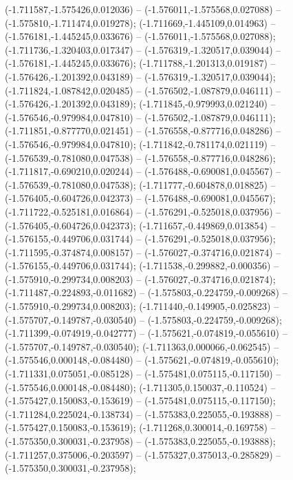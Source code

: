  (-1.711587,-1.575426,0.012036) -- (-1.576011,-1.575568,0.027088) -- (-1.575810,-1.711474,0.019278);
 (-1.711669,-1.445109,0.014963) -- (-1.576181,-1.445245,0.033676) -- (-1.576011,-1.575568,0.027088);
 (-1.711736,-1.320403,0.017347) -- (-1.576319,-1.320517,0.039044) -- (-1.576181,-1.445245,0.033676);
 (-1.711788,-1.201313,0.019187) -- (-1.576426,-1.201392,0.043189) -- (-1.576319,-1.320517,0.039044);
 (-1.711824,-1.087842,0.020485) -- (-1.576502,-1.087879,0.046111) -- (-1.576426,-1.201392,0.043189);
 (-1.711845,-0.979993,0.021240) -- (-1.576546,-0.979984,0.047810) -- (-1.576502,-1.087879,0.046111);
 (-1.711851,-0.877770,0.021451) -- (-1.576558,-0.877716,0.048286) -- (-1.576546,-0.979984,0.047810);
 (-1.711842,-0.781174,0.021119) -- (-1.576539,-0.781080,0.047538) -- (-1.576558,-0.877716,0.048286);
 (-1.711817,-0.690210,0.020244) -- (-1.576488,-0.690081,0.045567) -- (-1.576539,-0.781080,0.047538);
 (-1.711777,-0.604878,0.018825) -- (-1.576405,-0.604726,0.042373) -- (-1.576488,-0.690081,0.045567);
 (-1.711722,-0.525181,0.016864) -- (-1.576291,-0.525018,0.037956) -- (-1.576405,-0.604726,0.042373);
 (-1.711657,-0.449869,0.013854) -- (-1.576155,-0.449706,0.031744) -- (-1.576291,-0.525018,0.037956);
 (-1.711595,-0.374874,0.008157) -- (-1.576027,-0.374716,0.021874) -- (-1.576155,-0.449706,0.031744);
 (-1.711538,-0.299882,-0.000356) -- (-1.575910,-0.299734,0.008203) -- (-1.576027,-0.374716,0.021874);
 (-1.711487,-0.224893,-0.011682) -- (-1.575803,-0.224759,-0.009268) -- (-1.575910,-0.299734,0.008203);
 (-1.711440,-0.149905,-0.025823) -- (-1.575707,-0.149787,-0.030540) -- (-1.575803,-0.224759,-0.009268);
 (-1.711399,-0.074919,-0.042777) -- (-1.575621,-0.074819,-0.055610) -- (-1.575707,-0.149787,-0.030540);
 (-1.711363,0.000066,-0.062545) -- (-1.575546,0.000148,-0.084480) -- (-1.575621,-0.074819,-0.055610);
 (-1.711331,0.075051,-0.085128) -- (-1.575481,0.075115,-0.117150) -- (-1.575546,0.000148,-0.084480);
 (-1.711305,0.150037,-0.110524) -- (-1.575427,0.150083,-0.153619) -- (-1.575481,0.075115,-0.117150);
 (-1.711284,0.225024,-0.138734) -- (-1.575383,0.225055,-0.193888) -- (-1.575427,0.150083,-0.153619);
 (-1.711268,0.300014,-0.169758) -- (-1.575350,0.300031,-0.237958) -- (-1.575383,0.225055,-0.193888);
 (-1.711257,0.375006,-0.203597) -- (-1.575327,0.375013,-0.285829) -- (-1.575350,0.300031,-0.237958);
